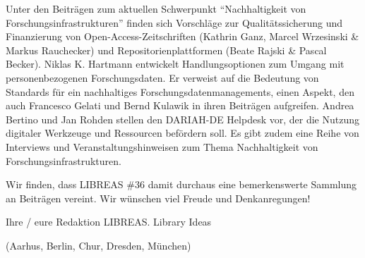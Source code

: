 \documentclass[a4paper,
fontsize=11pt,
oneside,
numbers=noperiodatend,
parskip=half-,
bibliography=totoc,
final
]{scrartcl}
\begin{document}
Unter den Beiträgen zum aktuellen Schwerpunkt \enquote{Nachhaltigkeit
von Forschungsinfrastrukturen} finden sich Vorschläge zur
Qualitätssicherung und Finanzierung von Open-Access-Zeit\-schriften
(Kathrin Ganz, Marcel Wrzesinski \& Markus Rauchecker) und
Repositorienplattformen (Beate Rajski \& Pascal Becker). Niklas K.
Hartmann entwickelt Handlungsoptionen zum Umgang mit personenbezogenen
Forschungsdaten. Er verweist auf die Bedeutung von Standards für ein
nachhaltiges Forschungsdatenmanagements, einen Aspekt, den auch
Francesco Gelati und Bernd Kulawik in ihren Beiträgen aufgreifen. Andrea
Bertino und Jan Rohden stellen den DARIAH-DE Helpdesk vor, der die
Nutzung digitaler Werkzeuge und Ressourcen befördern soll. Es gibt zudem
eine Reihe von Interviews und Veranstaltungshinweisen zum Thema
Nachhaltigkeit von Forschungsinfrastrukturen.

Wir finden, dass LIBREAS \#36 damit durchaus eine bemerkenswerte
Sammlung an Beiträgen vereint. Wir wünschen viel Freude und
Denkanregungen!

Ihre / eure Redaktion LIBREAS. Library Ideas

(Aarhus, Berlin, Chur, Dresden, München)

\end{document}
